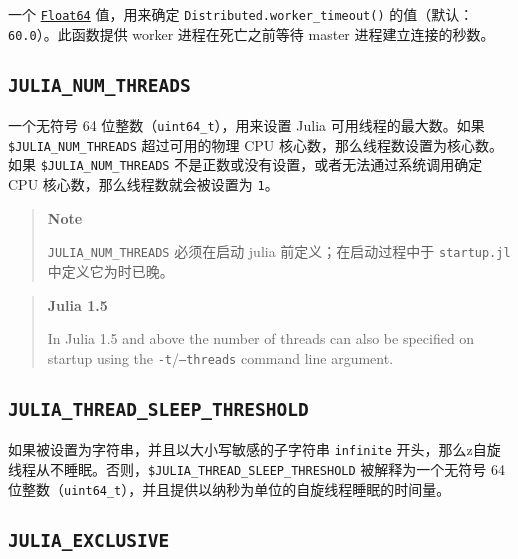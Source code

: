 一个 \hyperlink{5027751419500983000}{\texttt{Float64}} 值，用来确定 \texttt{Distributed.worker\_timeout()} 的值（默认：\texttt{60.0}）。此函数提供 worker 进程在死亡之前等待 master 进程建立连接的秒数。



\hypertarget{7328254851646027731}{}


\subsection{\texttt{JULIA\_NUM\_THREADS}}



一个无符号 64 位整数（\texttt{uint64\_t}），用来设置 Julia 可用线程的最大数。如果 \texttt{\$JULIA\_NUM\_THREADS} 超过可用的物理 CPU 核心数，那么线程数设置为核心数。如果 \texttt{\$JULIA\_NUM\_THREADS} 不是正数或没有设置，或者无法通过系统调用确定 CPU 核心数，那么线程数就会被设置为 \texttt{1}。



\begin{quote}
\textbf{Note}

\texttt{JULIA\_NUM\_THREADS} 必须在启动 julia 前定义；在启动过程中于 \texttt{startup.jl} 中定义它为时已晚。

\end{quote}


\begin{quote}
\textbf{Julia 1.5}

In Julia 1.5 and above the number of threads can also be specified on startup using the \texttt{-t}/\texttt{--threads} command line argument.

\end{quote}


\hypertarget{10532418503410947704}{}


\subsection{\texttt{JULIA\_THREAD\_SLEEP\_THRESHOLD}}



如果被设置为字符串，并且以大小写敏感的子字符串 \texttt{{\textquotedbl}infinite{\textquotedbl}} 开头，那么z自旋线程从不睡眠。否则，\texttt{\$JULIA\_THREAD\_SLEEP\_THRESHOLD} 被解释为一个无符号 64 位整数（\texttt{uint64\_t}），并且提供以纳秒为单位的自旋线程睡眠的时间量。



\hypertarget{12794875033848178110}{}


\subsection{\texttt{JULIA\_EXCLUSIVE}}



